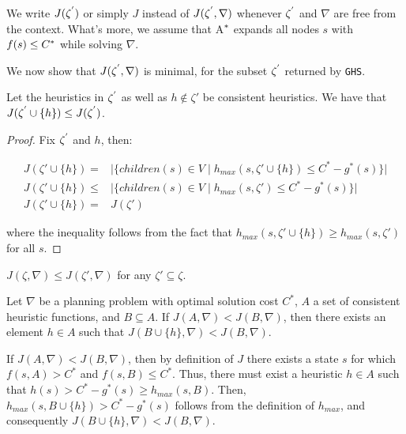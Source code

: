 We write $J(\zeta\sp{'})$ or simply $J$ instead of $J(\zeta\sp{'},\nabla)$ whenever $\zeta\sp{'}$ and $\nabla$ are free from the context. What's more, we assume that A$\sp{*}$ expands all nodes $s$ with $f(s) \leq C\sp{*}$ while solving $\nabla$. %

\iffalse
We now show that $J(\zeta\sp{'}, \nabla)$ is minimal, for the subset $\zeta\sp{'}$ returned by \texttt{GHS}.
\begin{theorem}
Let the heuristics in $\zeta\sp{'}$ as well as $h \notin \zeta'$ be consistent heuristics. We have that
$J(\zeta\sp{'} \cup \{h\}) \le J(\zeta\sp{'})$.\\
\label{lemma:monotonic}
\end{theorem}
\begin{proof}
Fix $\zeta\sp{'}$ and $h$, then: 
\begin{small}
\begin{align*}
J(\zeta' \cup \{h\})  =&\big| \big\{children(s)  \in V \mid h_{max}(s, \zeta'\cup \{h\}) \le C^* -g^*(s)\big\} \big|\\
J(\zeta' \cup \{h\})  \le&\big| \big\{children(s)  \in V \mid h_{max}(s, \zeta') \le C^* -g^*(s)\big\} \big|\\
J(\zeta' \cup \{h\})  =&J(\zeta')\
\end{align*} 
\end{small}
where the inequality follows from the fact that $h_{max}(s, \zeta'\cup \{h\})\ge h_{max}(s, \zeta')$ for all $s$.
\end{proof}

\begin{corollary}
$J(\zeta, \nabla) \leq J(\zeta', \nabla)$ for any $\zeta' \subseteq \zeta$.
\label{eq:max_optimal}
\end{corollary}

\begin{lemma}
Let $\nabla$ be a planning problem with optimal solution cost $C^*$, $A$  a set of consistent heuristic functions, and $B \subseteq A$. If $J(A, \nabla) < J(B, \nabla)$, then there exists an element $h \in A$ such that $J(B \cup \{h\}, \nabla) < J(B, \nabla)$.
\label{lemma:prop}
\end{lemma}

If $J(A, \nabla) < J(B, \nabla)$, then by definition of $J$ there exists a state $s$ for which $f(s, A) > C^*$ and $f(s, B) \le C^*$. Thus, there must exist a heuristic $h \in A$ such that $h(s) > C^* - g^*(s) \ge h_{max}(s, B)$. Then, $h_{max}(s, B \cup \{h\}) > C^* - g^*(s)$ follows from the definition of $h_{max}$, and consequently $J(B \cup \{h\}, \nabla) < J(B, \nabla)$.


